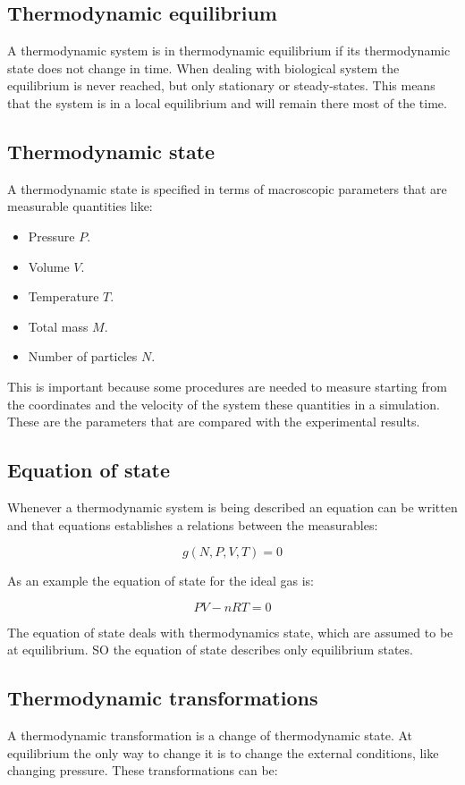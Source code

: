 	\subsection{Thermodynamic equilibrium}
	A thermodynamic system is in thermodynamic equilibrium if its thermodynamic state does not change in time.
	When dealing with biological system the equilibrium is never reached, but only stationary or steady-states.
	This means that the system is in a local equilibrium and will remain there most of the time.

	\subsection{Thermodynamic state}
	A thermodynamic state is specified in terms of macroscopic parameters that are measurable quantities like:

	\begin{multicols}{2}
		\begin{itemize}
			\item Pressure $P$.
			\item Volume $V$.
			\item Temperature $T$.
			\item Total mass $M$.
			\item Number of particles $N$.
		\end{itemize}
	\end{multicols}

	This is important because some procedures are needed to measure starting from the coordinates and the velocity of the system these quantities in a simulation.
	These are the parameters that are compared with the experimental results.

	\subsection{Equation of state}
	Whenever a thermodynamic system is being described an equation can be written and that equations establishes a relations between the measurables:

	$$g(N, P, V, T) = 0$$

	As an example the equation of state for the ideal gas is:

	$$PV-nRT=0$$

	The equation of state deals with thermodynamics state, which are assumed to be at equilibrium.
	SO the equation of state describes only equilibrium states.

	\subsection{Thermodynamic transformations}
	A thermodynamic transformation is a change of thermodynamic state.
	At equilibrium the only way to change it is to change the external conditions, like changing pressure.
	These transformations can be:

